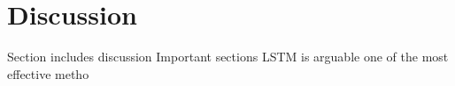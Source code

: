 \section{Discussion}
Section includes discussion
Important sections
LSTM is arguable one of the most effective metho